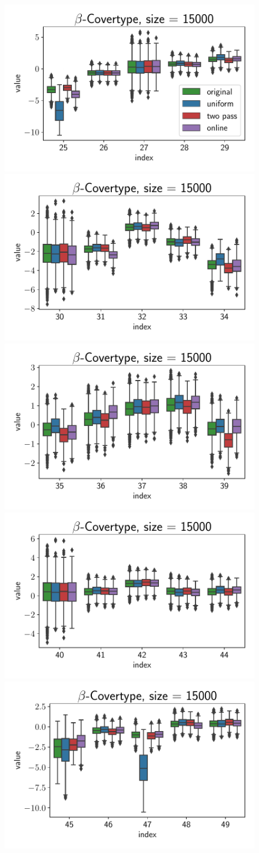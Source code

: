 \begin{figure}[ht!]
    \centering
    \includegraphics[width=.49\linewidth]{figures/covertype_coefficients/covertype_coefficients_25.pdf}
    \includegraphics[width=.49\linewidth]{figures/covertype_coefficients/covertype_coefficients_30.pdf}
    \includegraphics[width=.49\linewidth]{figures/covertype_coefficients/covertype_coefficients_35.pdf}
    \includegraphics[width=.49\linewidth]{figures/covertype_coefficients/covertype_coefficients_40.pdf}
    \includegraphics[width=.49\linewidth]{figures/covertype_coefficients/covertype_coefficients_45.pdf}

\end{figure}
